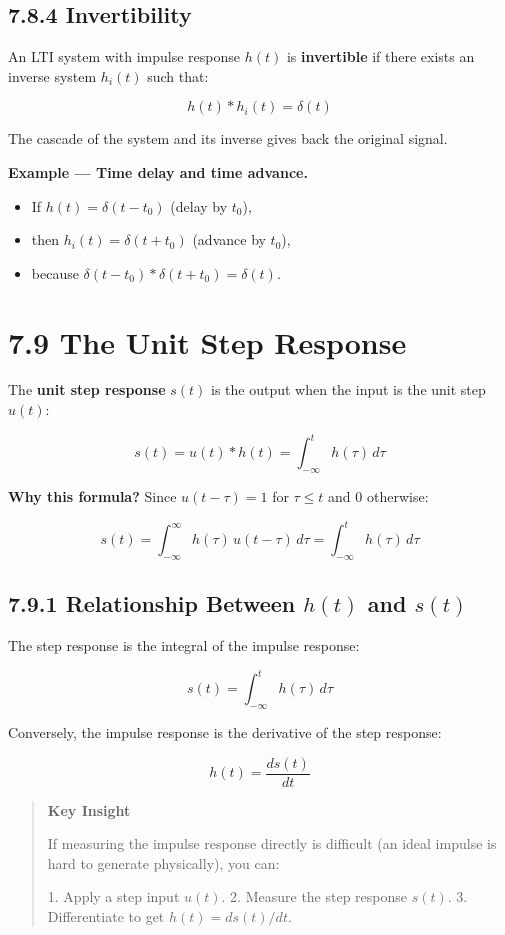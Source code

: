 \documentclass[11pt]{article}
\begin{document}
\subsection*{7.8.4 Invertibility}

An LTI system with impulse response $h(t)$ is \textbf{invertible} if there exists an inverse system $h_i(t)$ such that:

\[h(t)*h_i(t) = \delta(t)\]

The cascade of the system and its inverse gives back the original signal.

\textbf{Example — Time delay and time advance.}

\begin{itemize}
  \item If $h(t) = \delta(t - t_0)$ (delay by $t_0$),
  \item then $h_i(t) = \delta(t + t_0)$ (advance by $t_0$),
  \item because $\delta(t - t_0)*\delta(t + t_0) = \delta(t)$.
\end{itemize}

\section*{7.9 The Unit Step Response}

The \textbf{unit step response} $s(t)$ is the output when the input is the unit step $u(t)$:

\[\boxed{\;s(t) = u(t)*h(t) = \int_{-\infty}^{t} h(\tau)\,d\tau\;}\]

\textbf{Why this formula?} Since $u(t - \tau) = 1$ for $\tau \leq t$ and 0 otherwise:

\[s(t) = \int_{-\infty}^{\infty} h(\tau)\,u(t-\tau)\,d\tau = \int_{-\infty}^{t} h(\tau)\,d\tau\]

\subsection*{7.9.1 Relationship Between $h(t)$ and $s(t)$}

The step response is the integral of the impulse response:

\[s(t) = \int_{-\infty}^{t} h(\tau)\,d\tau\]

Conversely, the impulse response is the derivative of the step response:

\[\boxed{\;h(t) = \frac{d s(t)}{d t}\;}\]

\begin{quote}
\textbf{Key Insight}

If measuring the impulse response directly is difficult (an ideal impulse is hard to generate physically), you can:

1. Apply a step input $u(t)$.
2. Measure the step response $s(t)$.
3. Differentiate to get $h(t) = ds(t)/dt$.
\end{quote}
\end{document}
